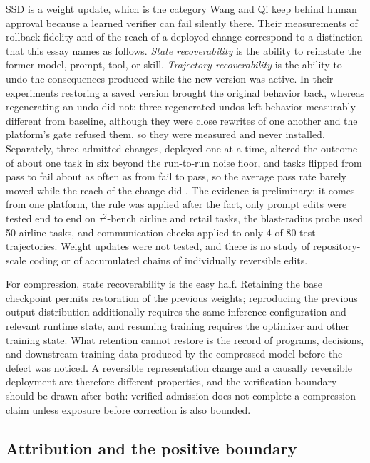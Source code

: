 \documentclass[11pt]{article}
\begin{document}
SSD is a weight update, which is the category Wang and Qi keep behind human
approval because a learned verifier can fail silently there. Their measurements of rollback fidelity and of the reach of a deployed change correspond to a distinction that this essay names as follows.
\emph{State recoverability} is the ability to reinstate the former model,
prompt, tool, or skill. \emph{Trajectory recoverability} is the ability to
undo the consequences produced while the new version was active. In their experiments restoring a saved version brought the original behavior back, whereas regenerating an undo did not: three regenerated undos left behavior measurably different from baseline, although they were close rewrites of one another and the platform's gate refused them, so they were measured and never installed. Separately, three admitted changes, deployed one at a time, altered the outcome of about one task in six beyond the run-to-run noise floor, and tasks flipped from pass to fail about as often as from fail to pass, so the average pass rate barely moved while the reach of the change did \cite{wang2026recoverability}. The evidence is preliminary: it comes from one platform, the rule was applied after the fact, only prompt edits were tested end to end on $\tau^2$-bench airline and retail tasks, the blast-radius probe used 50 airline tasks, and communication checks applied to only 4 of 80 test trajectories. Weight updates were not tested, and there is no study of repository-scale coding or of accumulated chains of individually reversible edits.

For compression, state recoverability is the easy half. Retaining the base checkpoint permits restoration of the previous weights; reproducing the previous output distribution additionally requires the same inference configuration and relevant runtime state, and resuming training requires the optimizer and other training state. What retention
cannot restore is the record of programs, decisions, and downstream
training data produced by the compressed model before the defect was
noticed. A reversible representation change and a causally reversible
deployment are therefore different properties, and the verification
boundary should be drawn after both: verified admission does not complete a
compression claim unless exposure before correction is also bounded.

\subsection{Attribution and the positive boundary}
\end{document}
